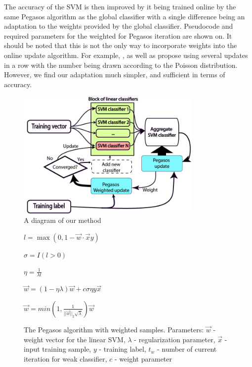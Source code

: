 The accuracy of the SVM is then improved by it being trained online by the same Pegasos algorithm as the global classifier with a single difference being an adaptation to the weights provided by the global classifier. Pseudocode and required parameters for the weighted for Pegasos iteration are shown on. It should be noted that this is not the only way to incorporate weights into the online update algorithm. For example, \cite{OZ}, as well as \cite{grabner2008} propose using several updates in a row with the number being drawn according to the Poisson distribution. However, we find our adaptation much simpler, and sufficient in terms of accuracy. 
\begin{figure}[t]
		\centering
		\includegraphics[width=0.8\textwidth]{OurmethodTrain}
		\caption[A diagram of our method]{A diagram of our method}
		\label{schema}
	\end{figure}
\begin{figure}[t]

\begin{algorithmic}


$l=\max (0, 1-\vec{w}\cdot\vec{x}y)$

$\sigma=I(l>0)$

$\eta=\frac{1}{\lambda{t}}$

$\vec{w}=(1-\eta\lambda)\vec{w}+{c}\sigma\eta{y}{\vec{x}}$

$\vec{w}=min\left(1,\frac{1}{||\vec{w}||_2\sqrt{\lambda}}\right)\vec{w} $
\EndFunction
\end{algorithmic}
\caption[The Pegasos algorithm with weighted samples]{The Pegasos algorithm with weighted samples. Parameters: $\vec{w}$ - weight vector for the linear SVM, $\lambda$ - regularization parameter, $\vec{x}$ -input training sample, $y$ - training label, $t_w$ - number of current iteration for weak classifier, $c$ - weight parameter 
}
\label{PegasosAl}
\end{figure}
